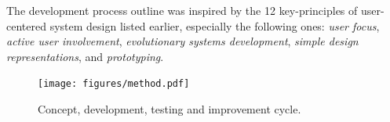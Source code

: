 
The development process outline was inspired by the
12 key-principles of user-centered system design
listed earlier, especially the following ones:
\textit{user focus},
\textit{active user involvement},
\textit{evolutionary systems development},
\textit{simple design representations},
and
\textit{prototyping}.


\begin{figure}[h!]
  \centering
  \texttt{[image: figures/method.pdf]}
  \caption{Concept, development, testing and improvement cycle.}
\end{figure}


